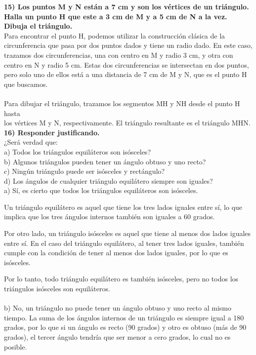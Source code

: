 \documentclass{article}
\begin{document}
{\bf 15) Los puntos M y N están a 7 cm y son los vértices de un triángulo. Halla un punto H que este a 3 cm de M y a 5 cm de N a la vez. Dibuja el triángulo. } \\
Para encontrar el punto H, podemos utilizar la construcción clásica de la circunferencia que pasa por dos puntos dados y tiene un radio dado. En este caso, trazamos dos circunferencias, una con centro en M y radio 3 cm, y otra con centro en N y radio 5 cm. Estas dos circunferencias se intersectan en dos puntos, pero solo uno de ellos está a una distancia de 7 cm de M y N, que es el punto H que buscamos.\\
\\
Para dibujar el triángulo, trazamos los segmentos MH y NH desde el punto H hasta\\
los vértices M y N, respectivamente. El triángulo resultante es el triángulo MHN.\\

{\bf 16) Responder justificando. } \\
¿Será verdad que:\\
a) Todos los triángulos equiláteros son isósceles?\\
b) Algunos triángulos pueden tener un ángulo obtuso y uno recto?\\
c) Ningún triángulo puede ser isósceles y rectángulo?\\
d) Los ángulos de cualquier triángulo equilátero siempre son iguales?\\

a) Sí, es cierto que todos los triángulos equiláteros son isósceles.

Un triángulo equilátero es aquel que tiene los tres lados iguales entre sí, lo que implica que los tres ángulos internos también son iguales a 60 grados.

Por otro lado, un triángulo isósceles es aquel que tiene al menos dos lados iguales entre sí. En el caso del triángulo equilátero, al tener tres lados iguales, también cumple con la condición de tener al menos dos lados iguales, por lo que es isósceles.

Por lo tanto, todo triángulo equilátero es también isósceles, pero no todos los triángulos isósceles son equiláteros.\\
\\
b) No, un triángulo no puede tener un ángulo obtuso y uno recto al mismo tiempo. La suma de los ángulos internos de un triángulo es siempre igual a 180 grados, por lo que si un ángulo es recto (90 grados) y otro es obtuso (más de 90 grados), el tercer ángulo tendría que ser menor a cero grados, lo cual no es posible.
\end{document}
